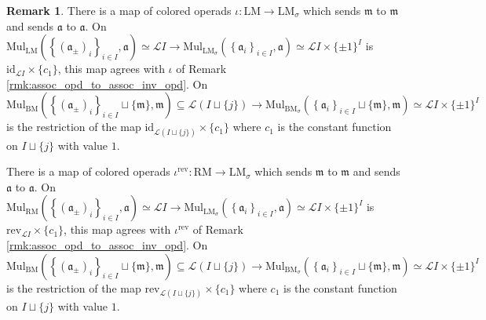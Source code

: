 \documentclass{article}
\theoremstyle{definition}
\newtheorem{remark}[equation]{Remark}
\begin{document}
\begin{remark}\label{rmk:lmod_opd_to_inv_lmod_opd}
    There is a map of colored operads $ \iota \colon \mathrm{LM} \to \mathrm{LM}_{\sigma} $ which sends $ \mathfrak{m} $ to $ \mathfrak{m} $ and sends $ \mathfrak{a} $ to $ \mathfrak{a} $. 
    On $ \mathrm{Mul}_{\mathrm{LM}}\left(\left\{(\mathfrak{a}_{\pm})_i\right\}_{i \in I}, \mathfrak{a}\right) \simeq  \mathcal{L}I \to \mathrm{Mul}_{\mathrm{LM}_\sigma}\left(\left\{\mathfrak{a}_i\right\}_{i \in I}, \mathfrak{a}\right) \simeq  \mathcal{L}I \times \{\pm 1\}^I $  is $ \mathrm{id}_{\mathcal{L}I} \times \{ c_1\} $, this map agrees with $ \iota $ of Remark \ref{rmk:assoc_opd_to_assoc_inv_opd}. 
    On $ \mathrm{Mul}_{\mathrm{BM}}\left(\left\{(\mathfrak{a}_{\pm})_i\right\}_{i \in I} \sqcup\{\mathfrak{m}\}, \mathfrak{m}\right) \subseteq  \mathcal{L}(I\sqcup \{j\}) \to \mathrm{Mul}_{\mathrm{BM}_\sigma}\left(\left\{\mathfrak{a}_i\right\}_{i \in I} \sqcup \{\mathfrak{m}\}, \mathfrak{m}\right) \simeq  \mathcal{L}I \times \{\pm 1\}^I $ is the restriction of the map $ \mathrm{id}_{\mathcal{L}(I\sqcup \{j\})} \times \{ c_1\} $ where $ c_1 $ is the constant function on $ I \sqcup \{j\} $ with value $ 1 $. 

    There is a map of colored operads $ \iota^{\mathrm{rev}} \colon \mathrm{RM} \to \mathrm{LM}_{\sigma} $ which sends $ \mathfrak{m} $ to $ \mathfrak{m} $ and sends $ \mathfrak{a} $ to $ \mathfrak{a} $. 
    On $ \mathrm{Mul}_{\mathrm{RM}}\left(\left\{(\mathfrak{a}_{\pm})_i\right\}_{i \in I}, \mathfrak{a}\right) \simeq  \mathcal{L}I \to \mathrm{Mul}_{\mathrm{LM}_\sigma}\left(\left\{\mathfrak{a}_i\right\}_{i \in I}, \mathfrak{a}\right) \simeq  \mathcal{L}I \times \{\pm 1\}^I $  is $ \mathrm{rev}_{\mathcal{L}I} \times \{ c_{1}\} $, this map agrees with $ \iota^{\mathrm{rev}} $ of Remark \ref{rmk:assoc_opd_to_assoc_inv_opd}. 
    On $ \mathrm{Mul}_{\mathrm{BM}}\left(\left\{(\mathfrak{a}_{\pm})_i\right\}_{i \in I} \sqcup\{\mathfrak{m}\}, \mathfrak{m}\right) \subseteq  \mathcal{L}(I\sqcup \{j\}) \to \mathrm{Mul}_{\mathrm{BM}_\sigma}\left(\left\{\mathfrak{a}_i\right\}_{i \in I} \sqcup \{\mathfrak{m}\}, \mathfrak{m}\right) \simeq  \mathcal{L}I \times \{\pm 1\}^I $ is the restriction of the map $ \mathrm{rev}_{\mathcal{L}(I\sqcup \{j\})} \times \{ c_1\} $ where $ c_1 $ is the constant function on $ I \sqcup \{j\} $ with value $ 1 $. 
\end{remark}
\end{document}
